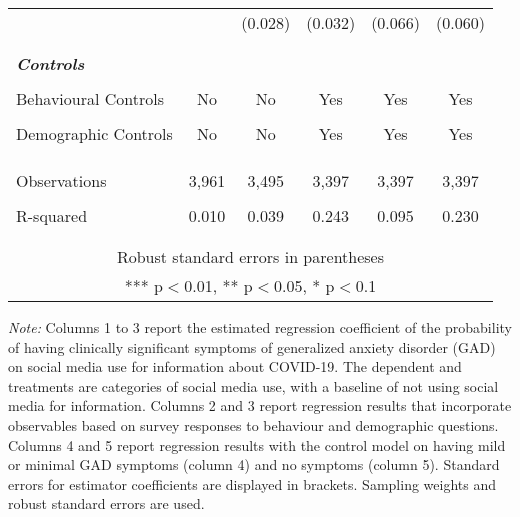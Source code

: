 \documentclass{article}[12pt]
\begin{document}
\begin{table}[!h]
{\begin{tabular}{lccccc}
                     &  & (0.028) & (0.032) & (0.066) & (0.060) \\
                    \\\\
                    \multicolumn{2}{l}{\bf \textit{Controls}} \\
                     \\
                    Behavioural Controls & No & No & Yes & Yes & Yes \\
                     \\
                    Demographic Controls & No & No & Yes & Yes & Yes \\
                     \\\\\\
                    Observations & 3,961 & 3,495 & 3,397 & 3,397 & 3,397 \\
                     \\
                    R-squared & 0.010 & 0.039 & 0.243 & 0.095 & 0.230 \\\\ \hline
                     \\
                    \multicolumn{6}{c}{ Robust standard errors in parentheses} \\
                    \multicolumn{6}{c}{ *** p$<$0.01, ** p$<$0.05, * p$<$0.1} \\
                \end{tabular}
                }
            \endgroup
            \begin{tablenotes}[flushleft]
                \item
                \textit{Note:} Columns 1 to 3 report the estimated regression coefficient of the probability of having clinically significant symptoms of generalized anxiety disorder (GAD) on social media use for information about COVID-19. The dependent and treatments are categories of social media use, with a baseline of not using social media for information. Columns 2 and 3 report regression results that incorporate observables based on survey responses to behaviour and demographic questions. Columns 4 and 5 report regression results with the control model on having mild or minimal GAD symptoms (column 4) and no symptoms (column 5). Standard errors for estimator coefficients are displayed in brackets. Sampling weights and robust standard errors are used.
            \end{tablenotes}
            
            \label{tab:baseline}
            
        \end{table}
        
\end{document}
